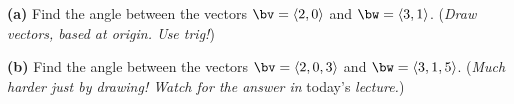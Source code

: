 \noindent \textbf{(a)} Find the angle between the vectors $\bv=\left<2,0\right>$ and $\bw=\left<3,1\right>$.  (\emph{Draw vectors, based at origin.  Use trig!})

\vspace{2.5in}
\noindent \textbf{(b)} Find the angle between the vectors $\bv=\left<2,0,3\right>$ and $\bw=\left<3,1,5\right>$.  (\emph{Much harder just by drawing!  Watch for the answer in} today's \emph{lecture.})